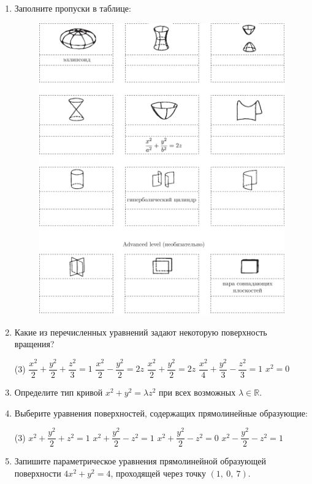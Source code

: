 \begin{enumerate}
	\item Заполните пропуски в таблице:
	\begin{figure}[ht]
		\centering
		\includegraphics{1}
	\end{figure}
	
	\item Какие из перечисленных уравнений задают некоторую поверхность вращения?
	\begin{tasks}[after-item-skip=5pt](3)
		\task $\dfrac{x^2}{2} + \dfrac{y^2}{2} + \dfrac{z^2}{3} = 1$
		\task $\dfrac{x^2}{2} - \dfrac{y^2}{2} = 2z$
		\task $\dfrac{x^2}{2} + \dfrac{y^2}{2} = 2z$
		\task $\dfrac{x^2}{4} + \dfrac{y^2}{3} - \dfrac{z^2}{3} = 1$
		\task $x^2=0$

	\end{tasks}
	
	\item Определите тип кривой $x^2 + y^2 = \lambda z^2$ при всех возможных $\lambda \in \mathbb{R}$.
	\vspace{4cm}
	\item Выберите уравнения поверхностей, содержащих прямолинейные образующие:	
	\begin{tasks}[after-item-skip=5pt](3)
		\task $x^2 + \dfrac{y^2}{2} + z^2 = 1$
		\task $x^2 + \dfrac{y^2}{2} - z^2 = 1$
		\task $x^2 + \dfrac{y^2}{2} - z^2 = 0$
		\task $x^2 - \dfrac{y^2}{2} - z^2 = 1$

	\end{tasks}
	\item Запишите параметрическое уравнения прямолинейной образующей поверхности $4x^2 + y^2 = 4$, проходящей через точку $(1,\ 0,\ 7)$.

\end{enumerate}